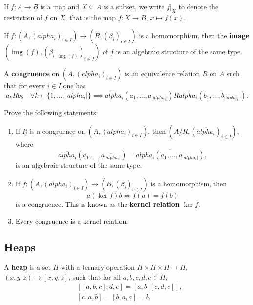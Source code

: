 \documentclass{svmult}
\def\alpha{alpha}%
\newcommand{\im}{\operatorname{img}}
\begin{document}
If $f\colon A\to B$ is a map and $X\subseteq A$ is a subset, 
we write $f|_X$ to denote 
the restriction of $f$ on $X$, that is the
map $f\colon X\to B$, $x\mapsto f(x)$. 

\begin{exercise}
    If $f\colon (A,(\alpha_i)_{i\in I})\to (B,(\beta_i)_{i\in I})$ is
    a homomorphism, then the \textbf{image}  
    $\left(\im(f),(\beta_i|_{\im(f)})_{i\in I}\right)$ of $f$ 
    is an algebraic structure of the same type. 
\end{exercise}

\begin{definition}
    A \textbf{congruence} on 
    $(A,(\alpha_i)_{i\in I})$ is an equivalence relation $R$ on $A$ 
    such that for every $i\in I$ one has 
    \[
    a_k R b_k\quad\forall k\in\{1,\dots,|\alpha_i|\}\implies \alpha_i(a_1,\dots,a_{|\alpha_i|}) R \alpha_i(b_1,\dots,b_{|\alpha_i|}).
    \]
\end{definition}

\begin{exercise}
Prove the following statements:
\begin{enumerate}
    \item If $R$ is a congruence on $(A,(\alpha_i)_{i\in I})$, then 
    $\left(A/R,(\overline{\alpha_i})_{i\in I}\right)$, 
    where 
    \[
    \overline{\alpha_i}(\overline{a_1},\dots,\overline{a_{|\alpha_i|}})
    =\overline{\alpha_i(a_1,\dots,a_{|\alpha_i|})},
    \]
    is an algebraic structure of the same type. 
    \item If $f\colon (A,(\alpha_i)_{i\in I})\to (B,(\beta_i)_{i\in I})$ is a homomorphism, 
    then 
    \[
    a(\ker f)b\Longleftrightarrow f(a)=f(b)
    \]
    is a congruence. This is known as the \textbf{kernel relation}
    $\ker f$.  
    \item Every congruence is a kernel relation. 
\end{enumerate}
\end{exercise}

\subsection{Heaps}

\begin{definition}
A \textbf{heap} is a set $H$ with a ternary operation $H\times H\times H\to H$, $(x,y,z)\mapsto [x,y,z]$, 
such that for all $a,b,c,d,e\in H$, 
\begin{align}
    \label{eq:associativity}&[[a,b,c],d,e]=[a,b,[c,d,e]],\\
    \label{eq:Malcev}&[a,a,b]=[b,a,a]=b.
\end{align}
\end{definition}
\end{document}
